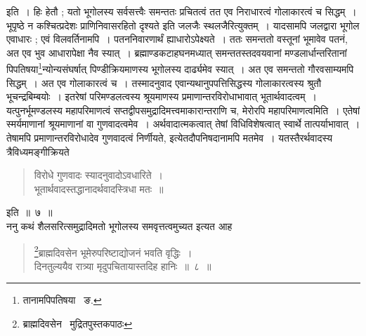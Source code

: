 \documentclass[11pt, openany]{book}
\begin{document}
\indent इति~। हिः हेतौ ; यतो भूगोलस्य सर्वसत्त्वैः समन्ततः प्रचितत्वं तत एव निराधारत्वं गोलाकारत्वं च सिद्धम्~। भूपृष्ठे न कश्चित्प्रदेशः प्राणिनिवासरहितो दृश्यते इति जलजैः स्थलजैरित्युक्तम्~। यादसामपि जलद्वारा भूगोल एवाधारः ; एवं विलवर्तिनामपि~। पतननिवारणार्थं ह्याधारोऽपेक्ष्यते~। ततः समन्ततो वस्तूनां भूमावेव पतनं, अत एव भुव आधारापेक्षा नैव स्यात्~। ब्रह्माण्डकटाहघनमध्यात् समन्ततस्तदवयवानां मण्डलार्धान्तरितानां पिपतिषया\renewcommand{\thefootnote}{२}\footnote{तानामपिपतिषया \textendash\ ङ.}न्योन्यसंघर्षात् पिण्डीक्रियमाणस्य भूगोलस्य दार्ढ्यमेव स्यात्~। अत एव समन्ततो गौरवसाम्यमपि सिद्धम्~। अत एव गोलाकारत्वं च~। तस्मादनुवाद एवान्यथानुपपत्तिसिद्धस्य गोलाकारत्वस्य श्रुतौ भूचन्द्रबिम्बयोः~। इतरेषां परिमण्डलत्वस्य श्रूयमाणस्य प्रमाणान्तरविरोधाभावात् भूतार्थवादत्वम्~। यत्पुनर्भूमण्डलस्य महापरिमाणत्वं सप्तद्वीपसमुद्रादिमत्त्वमाकारान्तराणि च, मेरोरपि महापरिमाणत्वमिति~। एतेषां स्मर्यमाणानां श्रूयमाणानां वा गुणवादत्वमेव~। अर्थवादात्मकत्वात् तेषां विधिविशेषत्वात् स्वार्थे तात्पर्याभावात्~। तेषामपि प्रमाणान्तरविरोधादेव गुणवादत्वं निर्णीयते, इत्येतदौपनिषदानामपि मतमेव~। यतस्तैरर्थवादस्य त्रैविध्यमङ्गीक्रियते\textendash  
\begin{quote}
{\qt विरोधे गुणवादः स्यादनुवादोऽवधारिते~। \\
भूतार्थवादस्तद्धानादर्थवादस्त्रिधा मतः~॥} 
\end{quote}
इति~॥~७~॥ \\

\indent ननु कथं शैलसरित्समुद्रादिमतो भूगोलस्य समवृत्तत्वमुच्यत इत्यत आह\textendash 

\newpage

\begin{quote}
\renewcommand{\thefootnote}{*}\footnote{ब्राह्मदिवसेन \textendash\ मुद्रितपुस्तकपाठः}{\ab ब्राह्मदिवसेन भूमेरुपरिष्टाद्योजनं भवति वृद्धिः~। \\
दिनतुल्ययैव रात्र्या मृदुपचितायास्तदिह हानिः~॥~८~॥} 
\end{quote}
\end{document}
